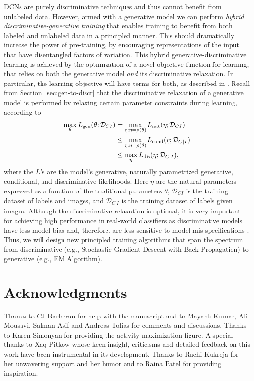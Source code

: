 \documentclass[12pt]{article}
\begin{document}
DCNs are purely discriminative techniques and thus cannot benefit from unlabeled data. However, armed with a generative model we can perform \emph{hybrid discriminative-generative training \cite{bishop2007generative}} that enables training to benefit from both labeled and unlabeled data in a principled manner. This should dramatically increase the power of pre-training, by encouraging representations of the input that have disentangled factors of variation. This hybrid generative-discriminative learning is achieved by the optimization of a novel objective function for learning, that relies on both the generative model \emph{and} its discriminative relaxation. In particular, the learning objective will have terms for both, as described in \cite{bishop2007generative}. Recall from Section~\ref{sec:gen-to-discr}  that the discriminative relaxation of a generative model is performed by relaxing certain parameter constraints during learning, according to
\begin{align} 
	\max_{\theta} L_{\rm gen}(\theta; \mathcal{D}_{CI}) &= \max_{\eta : \eta = \rho(\theta)} L_{\rm nat}(\eta; \mathcal{D}_{CI}) \nonumber\\
	&\leq \max_{\eta : \eta = \rho(\theta)} L_{\rm cond}(\eta; \mathcal{D}_{C|I}) \nonumber\\
	&\leq \max_{\eta}L_{\rm dis}(\eta; \mathcal{D}_{C|I}),
\end{align}
where the $L$'s are the model's generative, naturally parametrized generative, conditional, and discriminative likelihoods. Here $\eta$ are the natural parameters expressed as a function of the traditional parameters $\theta$, $\mathcal{D}_{CI}$ is the training dataset of labels and images, and $\mathcal{D}_{C|I}$ is the training dataset of labels given images. Although the discriminative relaxation is optional, it is very important for achieving high performance in real-world classifiers as discriminative models have less model bias and, therefore, are less sensitive to model mis-specifications \cite{jordan2002discriminative}. Thus, we will design new principled training algorithms that span the spectrum from discriminative (e.g., Stochastic Gradient Descent with Back Propagation) to generative (e.g., EM Algorithm).

\section*{Acknowledgments}
Thanks to CJ Barberan for help with the manuscript and to Mayank Kumar, Ali Mousavi, Salman Asif and Andreas Tolias for comments and discussions. Thanks to Karen Simonyan for providing the activity maximization figure. A special thanks to Xaq Pitkow whose keen insight, criticisms and detailed feedback on this work have been instrumental in its development. Thanks to Ruchi Kukreja for her unwavering support and her humor and to Raina Patel for providing inspiration.
\end{document}
